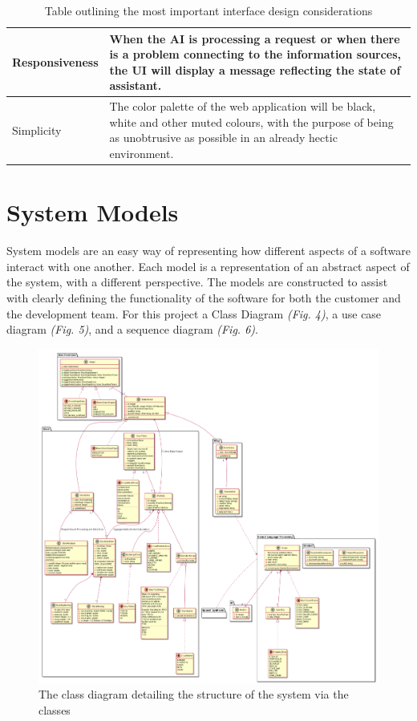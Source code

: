 \documentclass[]{IEEEtran}
\begin{document}
\begin{table}[h]
\begin{tabular}{| m{2cm} | m{5.5cm} | }
		\hline
		
		Responsiveness & When the AI is processing a request or when there is a problem connecting to the information sources, the UI will display a message reflecting the state of assistant. \\
		
		\hline 
		
		Simplicity & The color palette of the web application will be black, white and other muted colours, with the purpose of being as unobtrusive as possible in an already hectic environment. \\
		
		\hline
		
	
	\end{tabular}
		\caption{Table outlining the most important interface design considerations}
	
	\end{table}
	
	\section{System Models}
	
	System models are an easy way of representing how different aspects of a software interact with one another. Each model is a representation of an abstract aspect of the system, with a different perspective. The models are constructed to assist with clearly defining the functionality of the software for both the customer and the development team. For this project a Class Diagram \textit{(Fig. 4)}, a use case diagram \textit{(Fig. 5)}, and a sequence diagram \textit{(Fig. 6)}.
	
	\begin{figure}[h]
		\includegraphics[scale=0.361]{classdiagram}
		\caption{The class diagram detailing the structure of the system via the classes}
	\end{figure}
	
\end{document}
